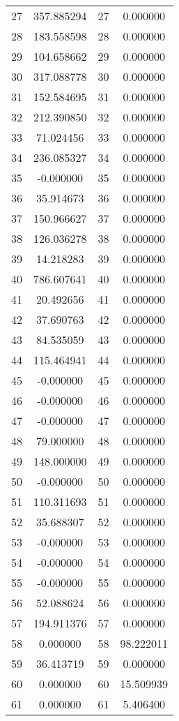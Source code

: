 \documentclass[12pt]{article}
\begin{document}
\begin{longtable}{@{}cccc@{}}
27 & 357.885294 & 27 & 0.000000 \\
28 & 183.558598 & 28 & 0.000000 \\
29 & 104.658662 & 29 & 0.000000 \\
30 & 317.088778 & 30 & 0.000000 \\
31 & 152.584695 & 31 & 0.000000 \\
32 & 212.390850 & 32 & 0.000000 \\
33 & 71.024456 & 33 & 0.000000 \\
34 & 236.085327 & 34 & 0.000000 \\
35 & -0.000000 & 35 & 0.000000 \\
36 & 35.914673 & 36 & 0.000000 \\
37 & 150.966627 & 37 & 0.000000 \\
38 & 126.036278 & 38 & 0.000000 \\
39 & 14.218283 & 39 & 0.000000 \\
40 & 786.607641 & 40 & 0.000000 \\
41 & 20.492656 & 41 & 0.000000 \\
42 & 37.690763 & 42 & 0.000000 \\
43 & 84.535059 & 43 & 0.000000 \\
44 & 115.464941 & 44 & 0.000000 \\
45 & -0.000000 & 45 & 0.000000 \\
46 & -0.000000 & 46 & 0.000000 \\
47 & -0.000000 & 47 & 0.000000 \\
48 & 79.000000 & 48 & 0.000000 \\
49 & 148.000000 & 49 & 0.000000 \\
50 & -0.000000 & 50 & 0.000000 \\
51 & 110.311693 & 51 & 0.000000 \\
52 & 35.688307 & 52 & 0.000000 \\
53 & -0.000000 & 53 & 0.000000 \\
54 & -0.000000 & 54 & 0.000000 \\
55 & -0.000000 & 55 & 0.000000 \\
56 & 52.088624 & 56 & 0.000000 \\
57 & 194.911376 & 57 & 0.000000 \\
58 & 0.000000 & 58 & 98.222011 \\
59 & 36.413719 & 59 & 0.000000 \\
60 & 0.000000 & 60 & 15.509939 \\
61 & 0.000000 & 61 & 5.406400 \\

\end{longtable}
\end{document}
